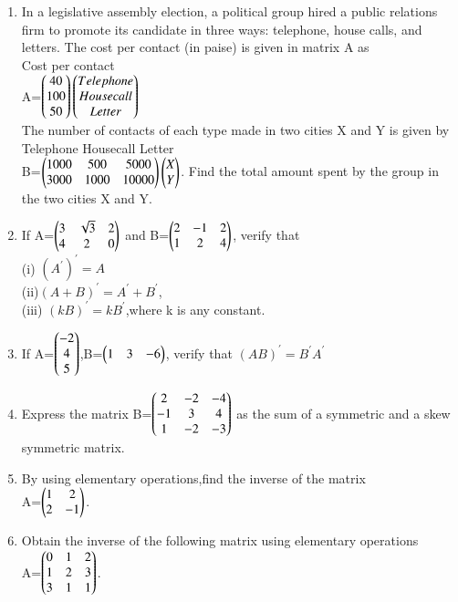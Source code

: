 \begin{enumerate}[label=\arabic*.,ref=\thesubsection.\theenumi]
\item In a legislative assembly election, a political group hired a public relations
firm to promote its candidate in three ways: telephone, house calls, and letters. The
cost per contact (in paise) is given in matrix A as\\ 
Cost per contact\\
A=$\begin{pmatrix}40 \\100 \\50\end{pmatrix}\begin{pmatrix}Telephone \\Housecall \\Letter\end{pmatrix}$\\
The number of contacts of each type made in two cities X and Y is given by\\
 Telephone  Housecall  Letter\\
B=$\begin{pmatrix}1000 &500 &5000\\3000 &1000 &10000\end{pmatrix} \begin{pmatrix}X \\Y\end{pmatrix}$. Find the total amount spent by the group in the two cities X and Y. 
\item If A=$\begin{pmatrix}3 &\sqrt{3} &2\\4 &2 &0\end{pmatrix}$ and B=$\begin{pmatrix}2 &-1 &2\\1 &2 &4\end{pmatrix}$, verify that\\
(i) $(A^{'})^{'}=A$\\ (ii)$(A+B)^{'}=A^{'}+B^{'}$,\\ (iii) $(kB)^{'}=kB^{'}$,where k is any constant.\\
\item If A=$\begin{pmatrix}-2\\4 \\5\end{pmatrix}$,B=$\begin{pmatrix}1 &3 &-6\end{pmatrix}$, verify that $(AB)^{'}=B^{'}A^{'}$\\
\item Express the matrix B=$\begin{pmatrix}2 &-2 &-4\\-1 &3 &4\\1 &-2 &-3\end{pmatrix}$ as the sum of a symmetric and a skew symmetric matrix.\\
\item By using elementary operations,find the inverse of the matrix\\
A=$\begin{pmatrix}1 &2\\2 &-1\end{pmatrix}$.\\
\item Obtain the inverse of the following matrix using elementary operations\\
A=$\begin{pmatrix}0 &1 &2\\1 &2 &3\\3 &1 &1\end{pmatrix}$.\\

\end{enumerate}
